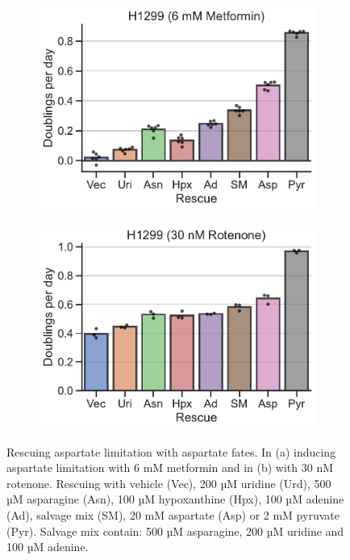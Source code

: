 \begin{figure}
     \centering
     \begin{subfigure}[b]{0.45\textwidth}
         \includegraphics[width=\textwidth]{figures/chap2/H1299_Met_rescue.pdf}
         \caption{}
         \label{fig:ch2:H1299_Met_rescue}
     \end{subfigure}
     \hfill
     \begin{subfigure}[b]{0.45\textwidth}
         \includegraphics[width=\textwidth]{figures/chap2/H1299_Rot_rescue.pdf}
         \caption{}
         \label{fig:ch2:H1299_Rot_rescue}
     \end{subfigure}
        \caption[Rescuing aspartate limitation with aspartate fates.]{
        Rescuing aspartate limitation with aspartate fates.
        In (a) inducing aspartate limitation with 6 mM metformin and in (b) with 30 nM rotenone.
        Rescuing with vehicle (Vec), 200 µM uridine (Urd), 500 µM asparagine (Asn), 100 µM hypoxanthine (Hpx), 100 µM adenine (Ad), salvage mix (SM), 20 mM aspartate (Asp) or 2 mM pyruvate (Pyr).
        Salvage mix contain: 500 µM asparagine, 200 µM uridine and 100 µM adenine. 
        }
        \label{fig:ch2:ETCrescue}
\end{figure}




